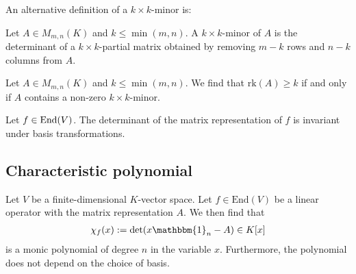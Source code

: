     An alternative definition of a $k\times k$-minor is:
    \begin{adefinition}[Minor]
        Let $A\in M_{m,n}(K)$ and $k\leq\min(m, n)$. A $k\times k$-minor of $A$ is the determinant of a $k\times k$-partial matrix obtained by removing $m-k$ rows and $n-k$ columns from $A$.
    \end{adefinition}
    \begin{property}
        Let $A\in M_{m,n}(K)$ and $k\leq\min(m, n)$. We find that $\text{rk}(A)\geq k$ if and only if $A$ contains a non-zero $k\times k$-minor.
    \end{property}

    \begin{property}
        Let $f\in\textup{End}(V)$. The determinant of the matrix representation of $f$ is invariant under basis transformations.
    \end{property}

\subsection{Characteristic polynomial}

    \begin{definition}\label{linalgebra:characteristic_polynomial}
        Let $V$ be a finite-dimensional $K$-vector space. Let $f\in \text{End}(V)$ be a linear operator with the matrix representation $A$. We then find that
        \begin{gather}
            \chi_f(x) := \det(x\mathbbm{1}_n - A) \in K[x]
        \end{gather}
        is a monic polynomial of degree $n$ in the variable $x$. Furthermore, the polynomial does not depend on the choice of basis.
    \end{definition}

